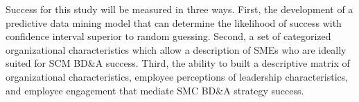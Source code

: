 Success for this study will be measured in three ways. First, the development of a predictive data mining model that can determine the likelihood of success with confidence interval superior to random guessing. Second, a set of categorized organizational characteristics which allow a description of SMEs who are ideally suited for SCM BD\&A success. Third, the ability to built a descriptive matrix of organizational characteristics, employee perceptions of leadership characteristics, and employee engagement that mediate SMC BD\&A strategy success.
